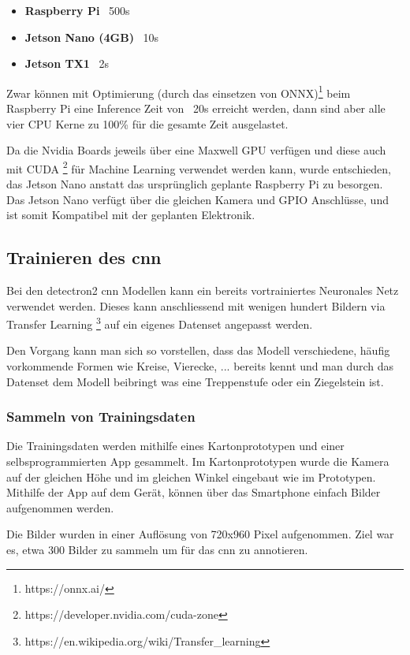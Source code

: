 \begin{itemize}
    \item {\bf Raspberry Pi}  ~500s
    \item {\bf Jetson Nano (4GB)} ~10s
    \item {\bf Jetson TX1} ~2s
\end{itemize}

Zwar können mit Optimierung (durch das einsetzen von ONNX)\footnote{https://onnx.ai/} beim Raspberry Pi eine Inference Zeit von ~20s erreicht werden, 
dann sind aber alle vier CPU Kerne zu 100\% für die gesamte Zeit ausgelastet.

Da die Nvidia Boards jeweils über eine Maxwell GPU verfügen und diese auch mit CUDA \footnote{https://developer.nvidia.com/cuda-zone}
für Machine Learning verwendet werden kann, wurde entschieden, das Jetson Nano anstatt das ursprünglich geplante
Raspberry Pi zu besorgen. Das Jetson Nano verfügt über die gleichen Kamera und GPIO Anschlüsse, und 
ist somit Kompatibel mit der geplanten Elektronik.

\subsection{Trainieren des \acrshort{cnn}}

Bei den detectron2 \acrshort{cnn} Modellen kann ein bereits vortrainiertes Neuronales Netz
verwendet werden. Dieses kann anschliessend mit wenigen hundert Bildern via Transfer Learning \footnote{https://en.wikipedia.org/wiki/Transfer\_learning}
auf ein eigenes Datenset angepasst werden.

Den Vorgang kann man sich so vorstellen, dass das Modell verschiedene, häufig vorkommende Formen wie Kreise, Vierecke, ...
bereits kennt und man durch das Datenset dem Modell beibringt was eine Treppenstufe oder ein Ziegelstein ist.

\subsubsection{Sammeln von Trainingsdaten}

Die Trainingsdaten werden mithilfe eines Kartonprototypen und einer selbsprogrammierten App gesammelt.
Im Kartonprototypen wurde die Kamera auf der gleichen Höhe und im gleichen Winkel eingebaut
wie im Prototypen.
Mithilfe der App auf dem Gerät, können über das Smartphone einfach Bilder aufgenommen werden.

Die Bilder wurden in einer Auflösung von 720x960 Pixel aufgenommen. Ziel war es, etwa 300 Bilder zu sammeln um für das \acrshort{cnn} zu annotieren.

